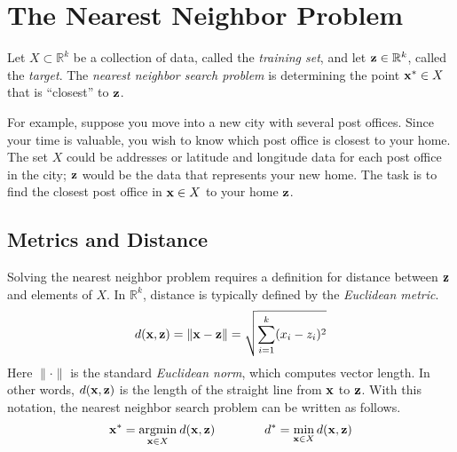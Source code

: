 

\section*{The Nearest Neighbor Problem} %

Let $X \subset \mathbb{R}^k$ be a collection of data, called the \emph{training set}, and let $\mathbf{z} \in \mathbb{R}^k$, called the \emph{target}.
The \emph{nearest neighbor search problem} is determining the point $\mathbf{x}^* \in X$ that is ``closest'' to $\mathbf{z}$.

For example, suppose you move into a new city with several post offices.
Since your time is valuable, you wish to know which post office is closest to your home.
The set $X$ could be addresses or latitude and longitude data for each post office in the city; $\mathbf{z}$ would be the data that represents your new home.
The task is to find the closest post office in $\mathbf{x} \in X$ to your home $\mathbf{z}$.

\subsection*{Metrics and Distance} %

Solving the nearest neighbor problem requires a definition for distance between $\mathbf{z}$ and elements of $X$.
In $\mathbb{R}^k$, distance is typically defined by the \emph{Euclidean metric}.
\begin{align}
\label{eq:nearest-neighbor-euclidean-metric}
d(\mathbf{x},\mathbf{z}) = \|\mathbf{x} - \mathbf{z}\| = \sqrt{\sum_{i=1}^k(x_i-z_i)^2}
\end{align}
Here $\|\cdot\|$ is the standard \emph{Euclidean norm}, which computes vector length.
In other words, $d(\mathbf{x},\mathbf{z})$ is the length of the straight line from $\mathbf{x}$ to $\mathbf{z}$.
With this notation, the nearest neighbor search problem can be written as follows.
\begin{align}
\label{eq:nearest-neighbor-def}
\mathbf{x}^* = \underset{\mathbf{x}\in X}{\text{argmin}}\:d(\mathbf{x},\mathbf{z})
\qquad\qquad
d^* = \min_{\mathbf{x}\in X}d(\mathbf{x},\mathbf{z})
\end{align}

